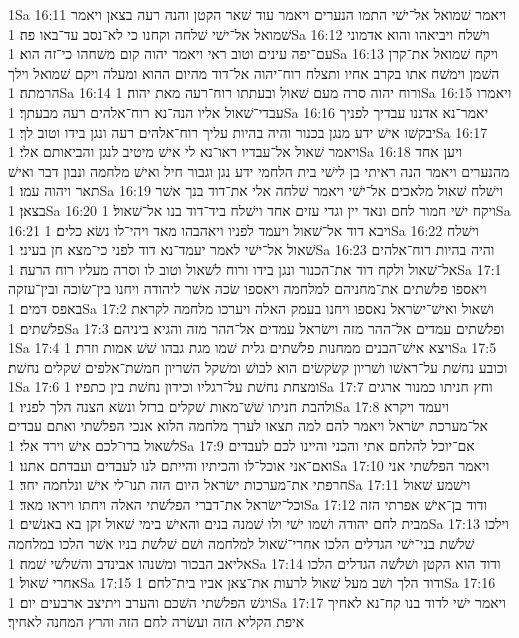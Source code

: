 1Sa 16:11  ויאמר שׁמואל אל־ישׁי התמו הנערים ויאמר עוד שׁאר הקטן והנה רעה בצאן ויאמר שׁמואל אל־ישׁי שׁלחה וקחנו כי לא־נסב עד־באו פה׃
1Sa 16:12  וישׁלח ויביאהו והוא אדמוני עם־יפה עינים וטוב ראי ויאמר יהוה קום משׁחהו כי־זה הוא׃
1Sa 16:13  ויקח שׁמואל את־קרן השׁמן וימשׁח אתו בקרב אחיו ותצלח רוח־יהוה אל־דוד מהיום ההוא ומעלה ויקם שׁמואל וילך הרמתה׃
1Sa 16:14  ורוח יהוה סרה מעם שׁאול ובעתתו רוח־רעה מאת יהוה׃
1Sa 16:15  ויאמרו עבדי־שׁאול אליו הנה־נא רוח־אלהים רעה מבעתך׃
1Sa 16:16  יאמר־נא אדננו עבדיך לפניך יבקשׁו אישׁ ידע מנגן בכנור והיה בהיות עליך רוח־אלהים רעה ונגן בידו וטוב לך׃
1Sa 16:17  ויאמר שׁאול אל־עבדיו ראו־נא לי אישׁ מיטיב לנגן והביאותם אלי׃
1Sa 16:18  ויען אחד מהנערים ויאמר הנה ראיתי בן לישׁי בית הלחמי ידע נגן וגבור חיל ואישׁ מלחמה ונבון דבר ואישׁ תאר ויהוה עמו׃
1Sa 16:19  וישׁלח שׁאול מלאכים אל־ישׁי ויאמר שׁלחה אלי את־דוד בנך אשׁר בצאן׃
1Sa 16:20  ויקח ישׁי חמור לחם ונאד יין וגדי עזים אחד וישׁלח ביד־דוד בנו אל־שׁאול׃
1Sa 16:21  ויבא דוד אל־שׁאול ויעמד לפניו ויאהבהו מאד ויהי־לו נשׂא כלים׃
1Sa 16:22  וישׁלח שׁאול אל־ישׁי לאמר יעמד־נא דוד לפני כי־מצא חן בעיני׃
1Sa 16:23  והיה בהיות רוח־אלהים אל־שׁאול ולקח דוד את־הכנור ונגן בידו ורוח לשׁאול וטוב לו וסרה מעליו רוח הרעה׃
1Sa 17:1  ויאספו פלשׁתים את־מחניהם למלחמה ויאספו שׂכה אשׁר ליהודה ויחנו בין־שׂוכה ובין־עזקה באפס דמים׃
1Sa 17:2  ושׁאול ואישׁ־ישׂראל נאספו ויחנו בעמק האלה ויערכו מלחמה לקראת פלשׁתים׃
1Sa 17:3  ופלשׁתים עמדים אל־ההר מזה וישׂראל עמדים אל־ההר מזה והגיא ביניהם׃
1Sa 17:4  ויצא אישׁ־הבנים ממחנות פלשׁתים גלית שׁמו מגת גבהו שׁשׁ אמות וזרת׃
1Sa 17:5  וכובע נחשׁת על־ראשׁו ושׁריון קשׂקשׂים הוא לבושׁ ומשׁקל השׁריון חמשׁת־אלפים שׁקלים נחשׁת׃
1Sa 17:6  ומצחת נחשׁת על־רגליו וכידון נחשׁת בין כתפיו׃
1Sa 17:7  וחץ חניתו כמנור ארגים ולהבת חניתו שׁשׁ־מאות שׁקלים ברזל ונשׂא הצנה הלך לפניו׃
1Sa 17:8  ויעמד ויקרא אל־מערכת ישׂראל ויאמר להם למה תצאו לערך מלחמה הלוא אנכי הפלשׁתי ואתם עבדים לשׁאול ברו־לכם אישׁ וירד אלי׃
1Sa 17:9  אם־יוכל להלחם אתי והכני והיינו לכם לעבדים ואם־אני אוכל־לו והכיתיו והייתם לנו לעבדים ועבדתם אתנו׃
1Sa 17:10  ויאמר הפלשׁתי אני חרפתי את־מערכות ישׂראל היום הזה תנו־לי אישׁ ונלחמה יחד׃
1Sa 17:11  וישׁמע שׁאול וכל־ישׂראל את־דברי הפלשׁתי האלה ויחתו ויראו מאד׃
1Sa 17:12  ודוד בן־אישׁ אפרתי הזה מבית לחם יהודה ושׁמו ישׁי ולו שׁמנה בנים והאישׁ בימי שׁאול זקן בא באנשׁים׃
1Sa 17:13  וילכו שׁלשׁת בני־ישׁי הגדלים הלכו אחרי־שׁאול למלחמה ושׁם שׁלשׁת בניו אשׁר הלכו במלחמה אליאב הבכור ומשׁנהו אבינדב והשׁלשׁי שׁמה׃
1Sa 17:14  ודוד הוא הקטן ושׁלשׁה הגדלים הלכו אחרי שׁאול׃
1Sa 17:15  ודוד הלך ושׁב מעל שׁאול לרעות את־צאן אביו בית־לחם׃
1Sa 17:16  ויגשׁ הפלשׁתי השׁכם והערב ויתיצב ארבעים יום׃
1Sa 17:17  ויאמר ישׁי לדוד בנו קח־נא לאחיך איפת הקליא הזה ועשׂרה לחם הזה והרץ המחנה לאחיך׃
